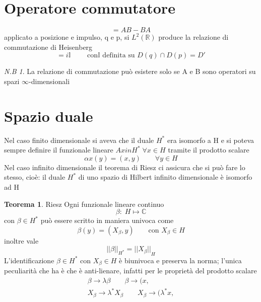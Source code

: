 \documentclass[a4paper,11pt]{report}
\theoremstyle{remark}
\newtheorem*{nb}{N.B}
\theoremstyle{definition}
\newtheorem*{teo}{Teorema}
\newcommand{\C}{\mathbb{C}}
\newcommand{\R}{\mathbb{R}}
\begin{document}
\section*{Operatore commutatore}

\begin{equation*}
	[A,B] = AB - BA
\end{equation*}
applicato a posizione e impulso, q e p, si $L^2(\R)$ produce la relazione di commutazione di Heisenberg
\begin{equation*}
	[q,p] = i\mathbb{I} \qquad \text{ con} \mathbb{I} \text{ definita su } D(q) \cap D(p) = D'
\end{equation*}
\begin{nb}
	La relazione di commutazione può esistere solo se A e B sono operatori su spazi  $\infty$-dimensionali
\end{nb}

\section{Spazio duale}
Nel caso finito dimensionale si aveva che il duale $H^*$ era isomorfo a H e si poteva sempre definire il funzionale lineare $Ax in H^* \; \forall x \in H$ tramite il prodotto scalare 
\begin{equation*}
	\alpha x (y) = (x,y) \qquad \forall y \in H
\end{equation*}
Nel caso infinito dimensionale il teorema di Riesz ci assicura che si può fare lo stesso, cioè: il duale $H^*$ di uno spazio di Hilbert infinito dimensionale è isomorfo ad H
\begin{teo}{Riesz}
	Ogni funzionale lineare continuo
	\begin{equation*}
		\beta: \; H \mapsto \C 
	\end{equation*}
	con $\beta \in H^*$ può essere scritto in maniera univoca come
	\begin{equation*}
		\beta(y) = (X_\beta, y) \qquad \text{con } X_\beta \in H 
	\end{equation*}
	inoltre vale 
	\begin{equation*}
		{||\beta||}_{H^*} = {||X_\beta||}_H
	\end{equation*}
	L'identificazione $\beta \in H^*$ con $X_\beta \in H$ è biunivoca e preserva la norma; l'unica peculiarità che ha è che è anti-lienare, infatti per le proprietà del prodotto scalare 
	\begin{gather*}
		\beta \to \lambda\beta \qquad \beta \to (x, \\
		X_\beta \to \lambda^*X_\beta \qquad X_\beta \to (\lambda^* x, 
	\end{gather*}
\end{teo}
\end{document}
